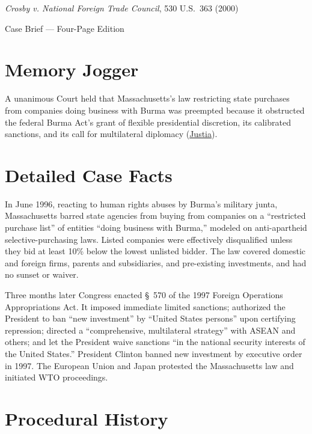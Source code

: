 \documentclass[12pt]{article}
\begin{document}
\begin{center}
{\LARGE \textit{Crosby v. National Foreign Trade Council}, 530 U.S.\ 363 (2000)\par}
\vspace{0.8em}
{\large Case Brief --- Four-Page Edition\par}
\end{center}
\vspace{1em}

\section{Memory Jogger}

A unanimous Court held that Massachusetts's law restricting state purchases from companies doing business with Burma was preempted because it obstructed the federal Burma Act's grant of flexible presidential discretion, its calibrated sanctions, and its call for multilateral diplomacy (\href{https://supreme.justia.com/cases/federal/us/530/363/}{Justia}).

\section{Detailed Case Facts}

In June 1996, reacting to human rights abuses by Burma's military junta, Massachusetts barred state agencies from buying from companies on a ``restricted purchase list'' of entities ``doing business with Burma,'' modeled on anti-apartheid selective-purchasing laws. Listed companies were effectively disqualified unless they bid at least 10\% below the lowest unlisted bidder. The law covered domestic and foreign firms, parents and subsidiaries, and pre-existing investments, and had no sunset or waiver.

Three months later Congress enacted \S~570 of the 1997 Foreign Operations Appropriations Act. It imposed immediate limited sanctions; authorized the President to ban ``new investment'' by ``United States persons'' upon certifying repression; directed a ``comprehensive, multilateral strategy'' with ASEAN and others; and let the President waive sanctions ``in the national security interests of the United States.'' President Clinton banned new investment by executive order in 1997. The European Union and Japan protested the Massachusetts law and initiated WTO proceedings.

\section{Procedural History}
\end{document}
